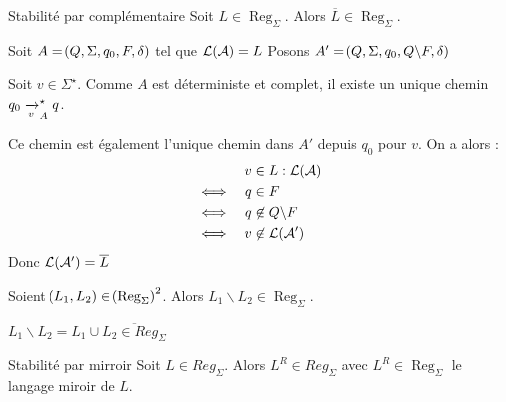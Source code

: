 \documentclass[a4paper,french,bookmarks]{book}
\DeclareMathOperator{\Reg}{Reg}
\begin{document}
    \begin{theorem}{Stabilité par complémentaire}{}
        Soit $L \in \Reg_\Sigma$. Alors $\overline{L} \in \Reg_\Sigma$.
    \end{theorem}
    
    \begin{nproof}
        Soit $A = \!\left(Q, \Sigma, q_0, F, \delta\right)$ tel que $\mathcal{L}\!\left(\mathcal{A}\right) = L$
        Posons $A' =  \!\left(Q, \Sigma, q_0, Q \backslash F, \delta\right)$
        
        Soit $v \in \Sigma^\star$. Comme $A$ est déterministe et complet, il existe un unique chemin $q_0 \lima{v}_A^\star q$.
    
        Ce chemin est également l'unique chemin dans $A'$ depuis $q_0$ pour $v$. On a alors :
        \begin{align*}
                && v &\in L : \mathcal{L}\!\left(\mathcal{A}\right)\\
            \iff && q &\in F\\
            \iff && q &\not\in Q \backslash F\\
            \iff && v &\not\in \mathcal{L}\!\left(\mathcal{A}'\right)
        \end{align*}
        Donc $\mathcal{L}\!\left(\mathcal{A}'\right) = \overline{L}$
    
    \end{nproof}
    
    \begin{corollary}{}{}
        Soient $\p{L_1, L_2} \in \p{\Reg_\Sigma}^2$. Alors $L_1 \backslash L_2 \in \Reg_\Sigma$.
    \end{corollary}
        
    \begin{nproof}
        $L_1 \backslash L_2 = L_1 \cup \overline{L_2 \in Reg_\Sigma}$
    \end{nproof}
    
    \begin{theorem}{Stabilité par mirroir}{}
        Soit $L \in Reg_\Sigma$.
        Alors $L^R \in Reg_\Sigma$ avec $L^R \in \Reg_\Sigma$ le langage miroir de $L$.
    \end{theorem}
    
\end{document}
